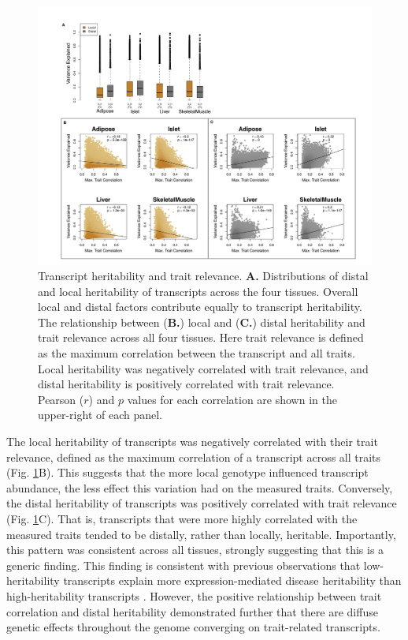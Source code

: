 \documentclass[
]{article}
\begin{document}
\begin{figure}[ht!]
\includegraphics[width=\textwidth]{Figures/Fig2_motivation.pdf} 
\caption{Transcript heritability and trait relevance. 
\textbf{A.} Distributions of distal and local heritability of 
transcripts across the four tissues. Overall local and distal 
factors contribute equally to transcript heritability. The 
relationship between (\textbf{B.}) local and (\textbf{C.}) 
distal heritability and trait relevance across all four tissues. 
Here trait relevance is defined as the maximum correlation between 
the transcript and all traits. Local heritability was negatively 
correlated with trait relevance, and distal heritability is 
positively correlated with trait relevance. Pearson ($r$) and $p$ 
values for each correlation are shown in the upper-right of each panel.}
\label{fig:motivation}
\end{figure}

The local heritability of transcripts was negatively correlated with
their trait relevance, defined as the maximum correlation of a
transcript across all traits (Fig. \ref{fig:motivation}B). This suggests
that the more local genotype influenced transcript abundance, the less
effect this variation had on the measured traits. Conversely, the distal
heritability of transcripts was positively correlated with trait
relevance (Fig. \ref{fig:motivation}C). That is, transcripts that were
more highly correlated with the measured traits tended to be distally,
rather than locally, heritable. Importantly, this pattern was consistent
across all tissues, strongly suggesting that this is a generic finding.
This finding is consistent with previous observations that
low-heritability transcripts explain more expression-mediated disease
heritability than high-heritability transcripts \cite{pmid32424349}.
However, the positive relationship between trait correlation and distal
heritability demonstrated further that there are diffuse genetic effects
throughout the genome converging on trait-related transcripts.
\end{document}
